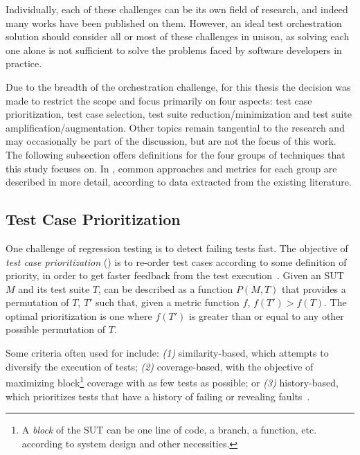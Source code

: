 \begin{itemize}
\end{itemize}

Individually, each of these challenges can be its own field of research, and indeed many works have been published on them.
However, an ideal test orchestration solution should consider all or most of these challenges in unison, as solving each one alone is not sufficient to solve the problems faced by software developers in practice.

Due to the breadth of the orchestration challenge, for this thesis the decision was made to restrict the scope and focus primarily on four aspects: test case prioritization, test case selection, test suite reduction/minimization and test suite amplification/augmentation.
Other topics remain tangential to the research and may occasionally be part of the discussion, but are not the focus of this work.
The following subsection offers definitions for the four groups of techniques that this study focuses on.
In , common approaches and metrics for each group are described in more detail, according to data extracted from the existing literature.

\subsection{Test Case Prioritization}
\label{sec:tcp}

One challenge of regression testing is to detect failing tests fast.
The objective of \textit{test case prioritization} (\tcp) is to re-order test cases according to some definition of priority, in order to get faster feedback from the test execution~\cite{yoo2012regression}.
Given an SUT $M$ and its test suite $T$,
\tcp can be described as a function $P(M, T)$ that provides a permutation of $T$, $T'$ such that, given a metric function $f$, $f(T') > f(T)$.
The optimal prioritization is one where $f(T')$ is greater than or equal to any other possible permutation of $T$.

Some criteria often used for \tcp include: \textit{(1)} similarity-based, which attempts to diversify the execution of tests; \textit{(2)} coverage-based, with the objective of maximizing block\footnote{A \textit{block} of the SUT can be one line of code, a branch, a function, etc. according to system design and other necessities.} coverage with as few tests as possible; or \textit{(3)} history-based, which prioritizes tests that have a history of failing or revealing faults~\cite{khatibsyarbini_test_2018}.

